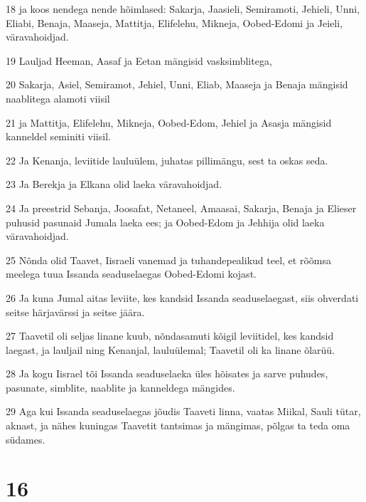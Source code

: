 \par 18 ja koos nendega nende hõimlased: Sakarja, Jaasieli, Semiramoti, Jehieli, Unni, Eliabi, Benaja, Maaseja, Mattitja, Elifelehu, Mikneja, Oobed-Edomi ja Jeieli, väravahoidjad.
\par 19 Lauljad Heeman, Aasaf ja Eetan mängisid vasksimblitega,
\par 20 Sakarja, Asiel, Semiramot, Jehiel, Unni, Eliab, Maaseja ja Benaja mängisid naablitega alamoti viisil
\par 21 ja Mattitja, Elifelehu, Mikneja, Oobed-Edom, Jehiel ja Asasja mängisid kanneldel seminiti viisil.
\par 22 Ja Kenanja, leviitide lauluülem, juhatas pillimängu, sest ta oskas seda.
\par 23 Ja Berekja ja Elkana olid laeka väravahoidjad.
\par 24 Ja preestrid Sebanja, Joosafat, Netaneel, Amaasai, Sakarja, Benaja ja Elieser puhusid pasunaid Jumala laeka ees; ja Oobed-Edom ja Jehhija olid laeka väravahoidjad.
\par 25 Nõnda olid Taavet, Iisraeli vanemad ja tuhandepealikud teel, et rõõmsa meelega tuua Issanda seaduselaegas Oobed-Edomi kojast.
\par 26 Ja kuna Jumal aitas leviite, kes kandsid Issanda seaduselaegast, siis ohverdati seitse härjavärssi ja seitse jäära.
\par 27 Taavetil oli seljas linane kuub, nõndasamuti kõigil leviitidel, kes kandsid laegast, ja lauljail ning Kenanjal, lauluülemal; Taavetil oli ka linane õlarüü.
\par 28 Ja kogu Iisrael tõi Issanda seaduselaeka üles hõisates ja sarve puhudes, pasunate, simblite, naablite ja kanneldega mängides.
\par 29 Aga kui Issanda seaduselaegas jõudis Taaveti linna, vaatas Miikal, Sauli tütar, aknast, ja nähes kuningas Taavetit tantsimas ja mängimas, põlgas ta teda oma südames.

\chapter{16}

